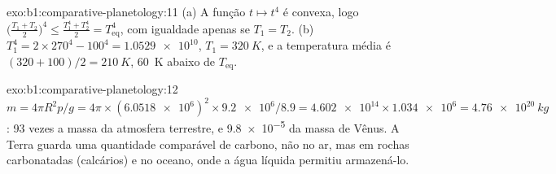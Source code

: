 \begin{solution}{exo:b1:comparative-planetology:11}
(a) A função $t\mapsto t^4$ é convexa, logo
$\bigl(\tfrac{T_1 + T_2}{2}\bigr)^4 \le \tfrac{T_1^4 + T_2^4}{2} =
T_\mathrm{eq}^4$, com igualdade apenas se $T_1 = T_2$. (b) $T_1^4 =
2\times270^4 - 100^4 = \num{1.0529e10}$, $T_1 = \qty{320}{K}$, e a temperatura
média é $(320 + 100)/2 = \qty{210}{K}$, \qty{60}{K} abaixo de
$T_\mathrm{eq}$.
\end{solution}

\begin{solution}{exo:b1:comparative-planetology:12}
$m = 4\pi R^2p/g = 4\pi\times(\num{6.0518e6})^2\times\num{9.2e6}/8.9 =
\num{4.602e14}\times\num{1.034e6} = \qty{4.76e20}{kg}$: 93 vezes a massa da
atmosfera terrestre, e \num{9.8e-5} da massa de Vênus. A Terra guarda uma
quantidade comparável de carbono, não no ar, mas em rochas carbonatadas (calcários) e no oceano, onde a água líquida permitiu armazená-lo.
\end{solution}

